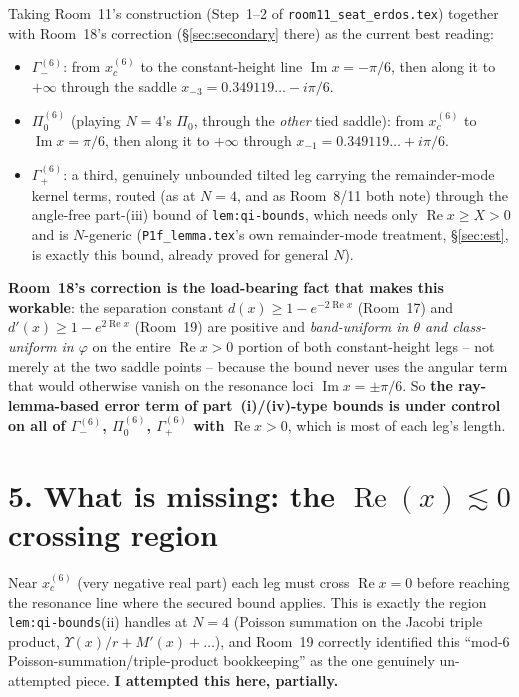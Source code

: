 \documentclass[11pt]{article}
\begin{document}
Taking Room~11's construction (Step~1--2 of \texttt{room11\_seat\_erdos.tex}) together with Room~18's
correction (\S\ref{sec:secondary} there) as the current best reading:
\begin{itemize}
\item $\Gamma_-^{(6)}$: from $x_c^{(6)}$ to the constant-height line $\operatorname{Im}x=-\pi/6$, then
along it to $+\infty$ through the saddle $x_{-3}=0.349119\ldots-i\pi/6$.
\item $\Pi_0^{(6)}$ (playing $N=4$'s $\Pi_0$, through the \emph{other} tied saddle): from $x_c^{(6)}$
to $\operatorname{Im}x=\pi/6$, then along it to $+\infty$ through $x_{-1}=0.349119\ldots+i\pi/6$.
\item $\Gamma_+^{(6)}$: a third, genuinely unbounded tilted leg carrying the remainder-mode kernel
terms, routed (as at $N=4$, and as Room~8/11 both note) through the angle-free part-(iii) bound of
\texttt{lem:qi-bounds}, which needs only $\operatorname{Re}x\ge X>0$ and is $N$-generic
(\texttt{P1f\_lemma.tex}'s own remainder-mode treatment, \S\ref{sec:est}, is exactly this bound, already
proved for general $N$).
\end{itemize}
\textbf{Room~18's correction is the load-bearing fact that makes this workable}: the separation constant
$d(x)\ge1-e^{-2\operatorname{Re}x}$ (Room~17) and $d'(x)\ge1-e^{2\operatorname{Re}x}$ (Room~19) are
positive and \emph{band-uniform in $\theta$ and class-uniform in $\varphi$} on the entire
$\operatorname{Re}x>0$ portion of both constant-height legs -- not merely at the two saddle points --
because the bound never uses the angular term that would otherwise vanish on the resonance loci
$\operatorname{Im}x=\pm\pi/6$. So \textbf{the ray-lemma-based error term of part~(i)/(iv)-type bounds
is under control on all of $\Gamma_-^{(6)}$, $\Pi_0^{(6)}$, $\Gamma_+^{(6)}$ with $\operatorname{Re}x>0$},
which is most of each leg's length.

\section*{5. What is missing: the $\operatorname{Re}(x)\lesssim0$ crossing region}

Near $x_c^{(6)}$ (very negative real part) each leg must cross $\operatorname{Re}x=0$ before reaching the
resonance line where the secured bound applies. This is exactly the region \texttt{lem:qi-bounds}(ii)
handles at $N=4$ (Poisson summation on the Jacobi triple product, $\Upsilon(x)/r+M'(x)+\ldots$), and
Room~19 correctly identified this ``mod-6 Poisson-summation/triple-product bookkeeping'' as the one
genuinely un-attempted piece. \textbf{I attempted this here, partially.}
\end{document}
